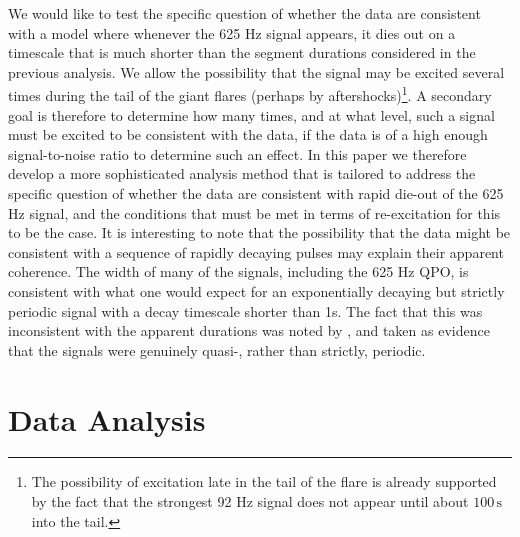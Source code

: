 \documentclass{emulateapj}
\begin{document}
We would like to test the specific question of whether the data are consistent with a model where whenever the 625 Hz signal appears, it dies out on a timescale that is much shorter than the segment durations considered in the previous analysis. We allow the possibility that the signal may be excited several times during the tail of the giant flares (perhaps by aftershocks)\footnote{The possibility of excitation late in the tail of the flare is already supported by the fact that the strongest 92 Hz signal does not appear until about $100\,\mathrm{s}$ into the tail.}. A secondary goal is therefore to determine how many times, and at what level, such a signal must be excited to be consistent with the data, if the data is of a high enough signal-to-noise ratio to determine such an effect. In this paper we therefore develop a more sophisticated analysis method that is tailored to address the specific question of whether the data are consistent with rapid die-out of the 625 Hz signal, and the conditions that must be met in terms of re-excitation for this to be the case. It is interesting to note that the possibility that the data might be consistent with a sequence of rapidly decaying pulses may explain their apparent coherence. The width of many of the signals, including the 625 Hz QPO, is consistent with what one would expect for an exponentially decaying but strictly periodic signal with a decay timescale shorter than 1s. The fact that this was inconsistent with the apparent durations was noted by \citet{Watts11}, and taken as evidence that the signals were genuinely quasi-, rather than strictly, periodic.

\section{Data Analysis \protect\footnotemark[2]} 
\label{sec:analysis}
\end{document}
